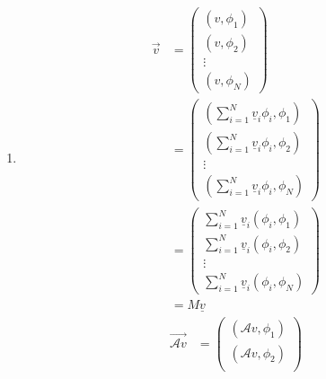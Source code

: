 \documentclass{article}
\begin{document}
\begin{enumerate}[1.]
    \item \begin{equation*}
              \begin{aligned}
                  \vec{v} & =\begin{pmatrix}
                                 (v,\phi_1) \\
                                 (v,\phi_2) \\
                                 \vdots     \\
                                 (v,\phi_N)
                             \end{pmatrix}                              \\
                          & =\begin{pmatrix}
                                 (\sum_{i=1}^N \underline{v}_i\phi_i,\phi_1) \\
                                 (\sum_{i=1}^N \underline{v}_i\phi_i,\phi_2) \\
                                 \vdots                                      \\
                                 (\sum_{i=1}^N \underline{v}_i\phi_i,\phi_N)
                             \end{pmatrix} \\
                          & =\begin{pmatrix}
                                 \sum_{i=1}^N \underline{v}_i(\phi_i,\phi_1) \\
                                 \sum_{i=1}^N \underline{v}_i(\phi_i,\phi_2) \\
                                 \vdots                                      \\
                                 \sum_{i=1}^N \underline{v}_i(\phi_i,\phi_N)
                             \end{pmatrix} \\
                          & =M\underline{v}
              \end{aligned}
          \end{equation*}
          \begin{equation*}
              \begin{aligned}
                  \overrightarrow{\mathcal{A}v} & =\begin{pmatrix}
                                                       (\mathcal{A}v,\phi_1) \\
                                                       (\mathcal{A}v,\phi_2) \\

\end{pmatrix}
\end{aligned}
\end{equation*}
\end{enumerate}
\end{document}
